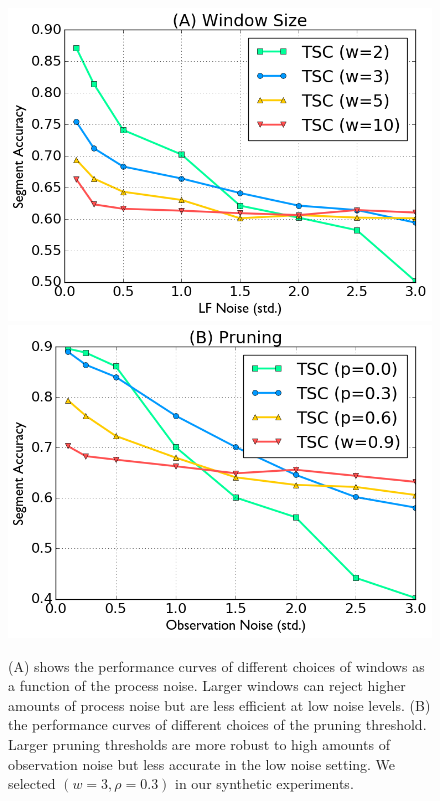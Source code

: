 \begin{figure}
\centering
\includegraphics[width=0.48\columnwidth]{tsc-experiments/exp3.png}
\includegraphics[width=0.48\columnwidth]{tsc-experiments/exp4.png}
\caption{(A) shows the performance curves of different choices of windows as a function of the process noise. Larger windows can reject higher amounts of process noise but are less efficient at low noise levels. (B) the performance curves of different choices of the pruning threshold. Larger pruning thresholds are more robust to high amounts of observation noise but less accurate in the low noise setting. We selected $(w=3, \rho=0.3)$ in our synthetic experiments. \label{exp3}}
\end{figure}

